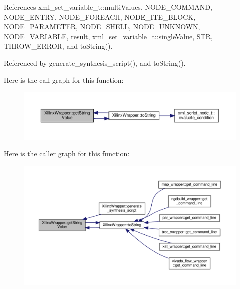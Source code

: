 References xml\+\_\+set\+\_\+variable\+\_\+t\+::multi\+Values, N\+O\+D\+E\+\_\+\+C\+O\+M\+M\+A\+ND, N\+O\+D\+E\+\_\+\+E\+N\+T\+RY, N\+O\+D\+E\+\_\+\+F\+O\+R\+E\+A\+CH, N\+O\+D\+E\+\_\+\+I\+T\+E\+\_\+\+B\+L\+O\+CK, N\+O\+D\+E\+\_\+\+P\+A\+R\+A\+M\+E\+T\+ER, N\+O\+D\+E\+\_\+\+S\+H\+E\+LL, N\+O\+D\+E\+\_\+\+U\+N\+K\+N\+O\+WN, N\+O\+D\+E\+\_\+\+V\+A\+R\+I\+A\+B\+LE, result, xml\+\_\+set\+\_\+variable\+\_\+t\+::single\+Value, S\+TR, T\+H\+R\+O\+W\+\_\+\+E\+R\+R\+OR, and to\+String().



Referenced by generate\+\_\+synthesis\+\_\+script(), and to\+String().

Here is the call graph for this function\+:
\nopagebreak
\begin{figure}[H]
\begin{center}
\leavevmode
\includegraphics[width=350pt]{d4/da0/classXilinxWrapper_a1a3f3f256c4552c913ad26396a7f3bab_cgraph}
\end{center}
\end{figure}
Here is the caller graph for this function\+:
\nopagebreak
\begin{figure}[H]
\begin{center}
\leavevmode
\includegraphics[width=350pt]{d4/da0/classXilinxWrapper_a1a3f3f256c4552c913ad26396a7f3bab_icgraph}
\end{center}
\end{figure}
\mbox{\label{classXilinxWrapper_abda54a2f377b1570bf7c045713557edf}} 
